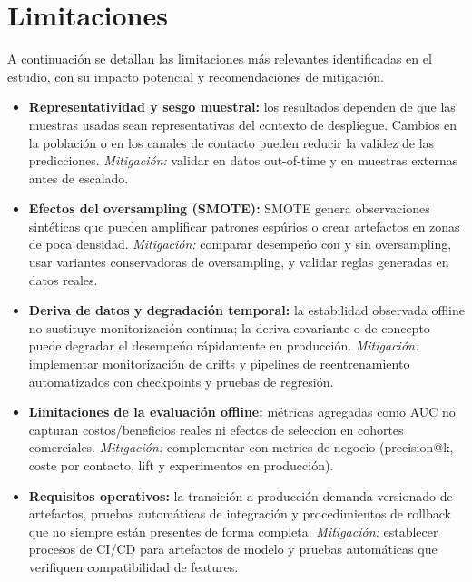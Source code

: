 \documentclass[12pt,a4paper]{article}
\begin{document}
\section{Limitaciones}
A continuaci\'on se detallan las limitaciones m\'as relevantes identificadas en el estudio, con su impacto potencial y recomendaciones de mitigaci\'on.
\begin{itemize}[leftmargin=*]
  \item \textbf{Representatividad y sesgo muestral:} los resultados dependen de que las muestras usadas sean representativas del contexto de despliegue. Cambios en la poblaci\'on o en los canales de contacto pueden reducir la validez de las predicciones. \textit{Mitigaci\'on:} validar en datos out-of-time y en muestras externas antes de escalado.
  \item \textbf{Efectos del oversampling (SMOTE):} SMOTE genera observaciones sint\'eticas que pueden amplificar patrones esp\'urios o crear artefactos en zonas de poca densidad. \textit{Mitigaci\'on:} comparar desempe\'no con y sin oversampling, usar variantes conservadoras de oversampling, y validar reglas generadas en datos reales.
  \item \textbf{Deriva de datos y degradaci\'on temporal:} la estabilidad observada offline no sustituye monitorizaci\'on continua; la deriva covariante o de concepto puede degradar el desempe\'no r\'apidamente en producci\'on. \textit{Mitigaci\'on:} implementar monitorizaci\'on de drifts y pipelines de reentrenamiento automatizados con checkpoints y pruebas de regresi\'on.
  \item \textbf{Limitaciones de la evaluaci\'on offline:} m\'etricas agregadas como AUC no capturan costos/beneficios reales ni efectos de seleccion en cohortes comerciales. \textit{Mitigaci\'on:} complementar con metrics de negocio (precision@k, coste por contacto, lift y experimentos en producci\'on).
  \item \textbf{Requisitos operativos:} la transici\'on a producci\'on demanda versionado de artefactos, pruebas autom\'aticas de integraci\'on y procedimientos de rollback que no siempre est\'an presentes de forma completa. \textit{Mitigaci\'on:} establecer procesos de CI/CD para artefactos de modelo y pruebas autom\'aticas que verifiquen compatibilidad de features.
\end{itemize}
\end{document}
